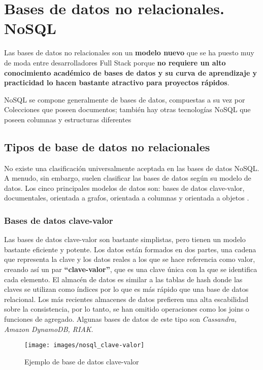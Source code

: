 \section{Bases de datos no relacionales. NoSQL}

Las bases de datos no relacionales son un \textbf{modelo nuevo} que se ha puesto muy de moda entre desarrolladores Full Stack porque \textbf{no requiere un alto conocimiento académico de bases de datos y su curva de aprendizaje y practicidad lo hacen bastante atractivo para proyectos rápidos}.

NoSQL se compone generalmente de bases de datos, compuestas a su vez por Colecciones que poseen documentos; también hay otras tecnologías NoSQL que poseen columnas y estructuras diferentes

\subsection{Tipos de base de datos no relacionales}

No existe una clasificación universalmente aceptada en las bases de datos NoSQL. A menudo, sin embargo, suelen clasificar las bases de datos según su modelo de datos. Los cinco principales modelos de datos son: bases de datos clave-valor, documentales, orientada a grafos, orientada a columnas y orientada a objetos \cite{ref1}.

\subsubsection{Bases de datos clave-valor}

Las bases de datos clave-valor son bastante simplistas, pero tienen un modelo bastante eficiente y potente. Los datos están formados en dos partes, una cadena que representa la clave y los datos reales a los que se hace referencia como valor, creando así un par \textbf{“clave-valor”}, que es una clave única con la que se identifica cada elemento. El almacén de datos es similar a las tablas de hash donde las claves se utilizan como índices por lo que es más rápido que una base de datos relacional. Los más recientes almacenes de datos prefieren una alta escabilidad sobre la consistencia, por lo tanto, se han omitido operaciones como los joins o funciones de agregado. Algunas bases de datos de este tipo son \textit{Cassandra, Amazon DynamoDB, RIAK}.

\begin{figure}[!h]
	\centering
	\texttt{[image: images/nosql\_clave-valor]}
	\caption{Ejemplo de base de datos clave-valor}
	\label{fig:bd_clave-valor}
\end{figure}

